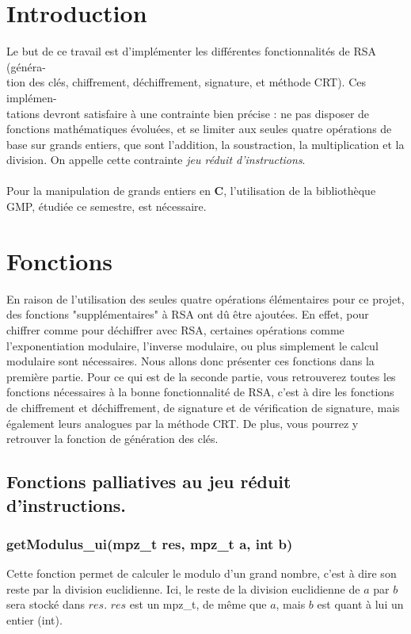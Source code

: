 \documentclass[12pt]{article}
\theoremstyle{definition}\newtheorem{defn}{Définition}
\theoremstyle{definition}\newtheorem{exm}{Exemple}
\theoremstyle{definition}\newtheorem{rem}{Remarque}
\theoremstyle{definition}\newtheorem{algo}{Algorithme}
\theoremstyle{remark}\newtheorem{exo}{Exercice}
\theoremstyle{remark}\newtheorem{nota}{Notation}
\begin{document}

\tableofcontents
\pagebreak
\section*{Introduction}

Le but de ce travail est d'implémenter les différentes fonctionnalités de RSA (généra-\\
tion des clés, chiffrement, déchiffrement, signature, et méthode CRT). Ces implémen-\\
tations devront satisfaire à une contrainte bien précise : ne pas disposer de fonctions mathématiques évoluées, et se limiter aux seules quatre opérations de base sur grands entiers, que sont l'addition, la soustraction, la multiplication et la division. On appelle cette contrainte \textit{jeu réduit d'instructions}.\\\\
Pour la manipulation de grands entiers en \textbf{C}, l'utilisation de la bibliothèque GMP, étudiée ce semestre, est nécessaire.


\pagebreak

\section{Fonctions}
En raison de l'utilisation des seules quatre opérations élémentaires pour ce projet, des fonctions "supplémentaires" à RSA ont dû être ajoutées. En effet, pour chiffrer comme pour déchiffrer avec RSA, certaines opérations comme l'exponentiation modulaire, l'inverse modulaire, ou plus simplement le calcul modulaire sont nécessaires. Nous allons donc présenter ces fonctions dans la première partie. Pour ce qui est de la seconde partie, vous retrouverez toutes les fonctions nécessaires à la bonne fonctionnalité de RSA, c'est à dire les fonctions de chiffrement et déchiffrement, de signature et de vérification de signature, mais également leurs analogues par la méthode CRT. De plus, vous pourrez y retrouver la fonction de génération des clés.

\subsection{Fonctions palliatives au jeu réduit d'instructions.}

\subsubsection{getModulus\_ui(mpz\_t res, mpz\_t a, int b)}
Cette fonction permet de calculer le modulo d'un grand nombre, c'est à dire son reste par la division euclidienne. Ici, le reste de la division euclidienne de $a$ par $b$ sera stocké dans $res$. $res$ est un mpz\_t, de même que $a$, mais $b$ est quant à lui un entier (int).
\end{document}
